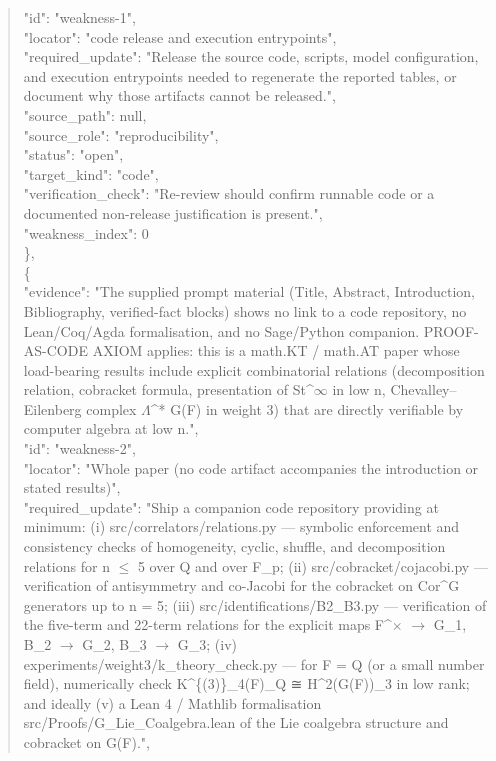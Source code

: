 \documentclass[11pt]{article}
\begin{document}
\begin{quote}
      "id": "weakness-1",\\
      "locator": "code release and execution entrypoints",\\
      "required\_update": "Release the source code, scripts, model configuration, and execution entrypoints needed to regenerate the reported tables, or document why those artifacts cannot be released.",\\
      "source\_path": null,\\
      "source\_role": "reproducibility",\\
      "status": "open",\\
      "target\_kind": "code",\\
      "verification\_check": "Re-review should confirm runnable code or a documented non-release justification is present.",\\
      "weakness\_index": 0\\
    \},\\
    \{\\
      "evidence": "The supplied prompt material (Title, Abstract, Introduction, Bibliography, verified-fact blocks) shows no link to a code repository, no Lean/Coq/Agda formalisation, and no Sage/Python companion. PROOF-AS-CODE AXIOM applies: this is a math.KT / math.AT paper whose load-bearing results include explicit combinatorial relations (decomposition relation, cobracket formula, presentation of St\^{}\ensuremath{\infty} in low n, Chevalley--Eilenberg complex \ensuremath{\Lambda}\^{}* G(F) in weight 3) that are directly verifiable by computer algebra at low n.",\\
      "id": "weakness-2",\\
      "locator": "Whole paper (no code artifact accompanies the introduction or stated results)",\\
      "required\_update": "Ship a companion code repository providing at minimum: (i) src/correlators/relations.py --- symbolic enforcement and consistency checks of homogeneity, cyclic, shuffle, and decomposition relations for n \ensuremath{\le} 5 over Q and over F\_p; (ii) src/cobracket/cojacobi.py --- verification of antisymmetry and co-Jacobi for the cobracket on Cor\^{}G generators up to n = 5; (iii) src/identifications/B2\_B3.py --- verification of the five-term and 22-term relations for the explicit maps F\^{}\ensuremath{\times} \ensuremath{\to} G\_1, B\_2 \ensuremath{\to} G\_2, B\_3 \ensuremath{\to} G\_3; (iv) experiments/weight3/k\_theory\_check.py --- for F = Q (or a small number field), numerically check K\^{}\{(3)\}\_4(F)\_Q ≅ H\^{}2(G(F))\_3 in low rank; and ideally (v) a Lean 4 / Mathlib formalisation src/Proofs/G\_Lie\_Coalgebra.lean of the Lie coalgebra structure and cobracket on G(F).",\\

\end{quote}
\end{document}
